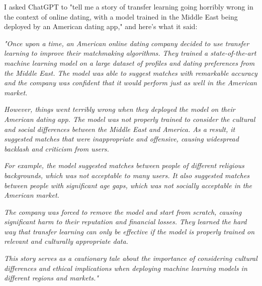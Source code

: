 I asked ChatGPT to "tell me a story of transfer learning going horribly wrong in the context of online dating, with a model trained in the Middle East being deployed by an American dating app," and here’s what it said:

\textit{"Once upon a time, an American online dating company decided to use transfer learning to improve their matchmaking algorithms. They trained a state-of-the-art machine learning model on a large dataset of profiles and dating preferences from the Middle East. The model was able to suggest matches with remarkable accuracy and the company was confident that it would perform just as well in the American market.}

\textit{However, things went terribly wrong when they deployed the model on their American dating app. The model was not properly trained to consider the cultural and social differences between the Middle East and America. As a result, it suggested matches that were inappropriate and offensive, causing widespread backlash and criticism from users.}

\textit{For example, the model suggested matches between people of different religious backgrounds, which was not acceptable to many users. It also suggested matches between people with significant age gaps, which was not socially acceptable in the American market.}

\textit{The company was forced to remove the model and start from scratch, causing significant harm to their reputation and financial losses. They learned the hard way that transfer learning can only be effective if the model is properly trained on relevant and culturally appropriate data.}

\textit{This story serves as a cautionary tale about the importance of considering cultural differences and ethical implications when deploying machine learning models in different regions and markets."}

